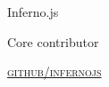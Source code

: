 {\raggedright
  {\large {
    Inferno.js
  } \\}


  Core contributor

  \textsc{\small\href{http://github.com/infernojs}{github/infernojs}}
} \\

